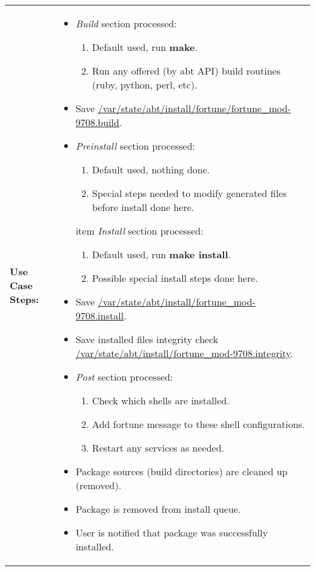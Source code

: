 \begin{tabularx}{\linewidth}{|l|X|}
\hline
\textbf{Use Case Steps:} & 
\begin{minipage}{\linewidth}
  \vspace{0.05em}
  \begin{itemize}
    \item \emph{Build} section processed:
    \begin{enumerate}
      \item Default used, run \textbf{make}.
      \item Run any offered (by abt API) build routines (ruby, python, perl, etc).
    \end{enumerate}
    \item Save \url{/var/state/abt/install/fortune/fortune_mod-9708.build}.
    \item \emph{Preinstall} section processed:
    \begin{enumerate}
      \item Default used, nothing done.
      \item Special steps needed to modify generated files before install done here.
    \end{enumerate}
    item \emph{Install} section processed:
    \begin{enumerate}
      \item Default used, run \textbf{make install}.
      \item Possible special install steps done here.
    \end{enumerate}
    \item Save \url{/var/state/abt/install/fortune_mod-9708.install}.
    \item Save installed files integrity check \url{/var/state/abt/install/fortune_mod-9708.integrity}.
    \item \emph{Post} section processed:
    \begin{enumerate}
      \item Check which shells are installed.
      \item Add fortune message to these shell configurations.
      \item Restart any services as needed.
    \end{enumerate}
    \item Package sources (build directories) are cleaned up (removed).
    \item Package is removed from install queue.
    \item User is notified that package was successfully installed.

\end{itemize}
\end{minipage}
\end{tabularx}
